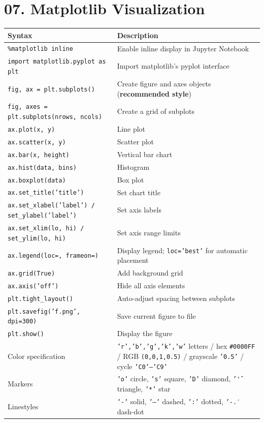 \documentclass[11pt,a4paper]{report}
\let\oldtexttt\texttt
\renewcommand{\texttt}[1]{\textcolor{mainblue}{\oldtexttt{#1}}}
\begin{document}
\section*{07. Matplotlib Visualization}
\small\renewcommand{\arraystretch}{1.3}
\centering
\begin{tabularx}{\textwidth}{@{}lX@{}}
\toprule
\textbf{Syntax} & \textbf{Description} \\ \midrule
\texttt{\%matplotlib inline} & Enable inline display in Jupyter Notebook \\
\texttt{import matplotlib.pyplot as plt} & Import matplotlib's pyplot interface \\
\texttt{fig, ax = plt.subplots()} & Create figure and axes objects (\textbf{recommended style}) \\
\texttt{fig, axes = plt.subplots(nrows, ncols)} & Create a grid of subplots \\
\texttt{ax.plot(x, y)} & Line plot \\
\texttt{ax.scatter(x, y)} & Scatter plot \\
\texttt{ax.bar(x, height)} & Vertical bar chart \\
\texttt{ax.hist(data, bins)} & Histogram \\
\texttt{ax.boxplot(data)} & Box plot \\
\texttt{ax.set\_title('title')} & Set chart title \\
\texttt{ax.set\_xlabel('label') / set\_ylabel('label')} & Set axis labels \\
\texttt{ax.set\_xlim(lo, hi) / set\_ylim(lo, hi)} & Set axis range limits \\
\texttt{ax.legend(loc=, frameon=)} & Display legend; \texttt{loc='best'} for automatic placement \\
\texttt{ax.grid(True)} & Add background grid \\
\texttt{ax.axis('off')} & Hide all axis elements \\
\texttt{plt.tight\_layout()} & Auto-adjust spacing between subplots \\
\texttt{plt.savefig('f.png', dpi=300)} & Save current figure to file \\
\texttt{plt.show()} & Display the figure \\
Color specification & \texttt{'r','b','g','k','w'} letters / hex \texttt{\#0000FF} / RGB \texttt{(0,0,1,0.5)} / grayscale \texttt{'0.5'} / cycle \texttt{'C0'--'C9'} \\
Markers & \texttt{'o'} circle, \texttt{'s'} square, \texttt{'D'} diamond, \texttt{'\^'} triangle, \texttt{'*'} star \\
Linestyles & \texttt{'-'} solid, \texttt{'--'} dashed, \texttt{':'} dotted, \texttt{'-.′} dash-dot \\
\bottomrule
\end{tabularx}
\normalsize
\end{document}
